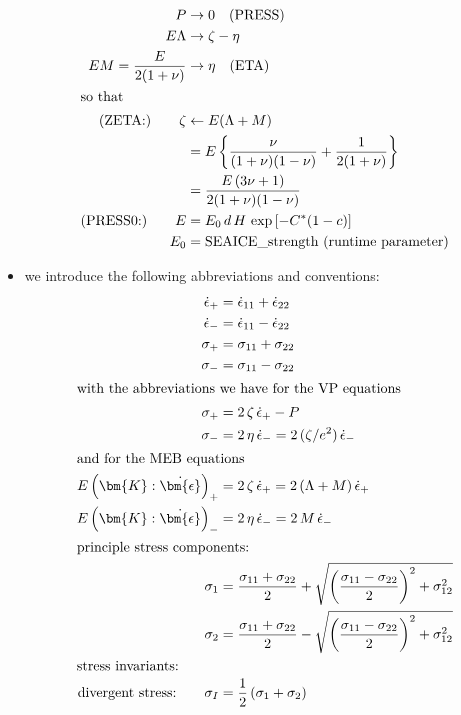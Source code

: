 \documentclass[12pt]{article}
\newcommand{\sr}{\dot{\epsilon}}
\newcommand{\srb}{\dot{\bm{\epsilon}}}
\begin{document}
\begin{itemize}
  \begin{align}
    \label{eq:p0}     P &\rightarrow0 \quad\text{(PRESS)}\\
    \label{eq:lambda} E\Lambda &\rightarrow \zeta - \eta \\
    \label{eq:mu}     EM
    = \frac{E}{2(1+\nu)} &\rightarrow \eta \quad\text{(ETA)} \\
    \intertext{so that}
    \label{eq:zeta} \text{(ZETA:)}\qquad
    \zeta &\leftarrow E(\Lambda+M) \\
                &= E\left\{\frac{\nu}{(1+\nu)(1-\nu)} +
                  \frac{1}{2(1+\nu)}\right\} \nonumber \\
                &= \frac{E\,(3\nu+1)}{2(1+\nu)(1-\nu)} \nonumber \\
    \text{(PRESS0:)}\qquad E &= E_0\,d\,H\,\exp\left[-C^*(1-c)\right] \\
    E_0&=\text{SEAICE\_strength (runtime parameter)}
  \end{align}
\item we introduce the following abbreviations and conventions:
  \begin{align}
    \sr_{+}&=\sr_{11}+\sr_{22}\\
    \sr_{-}&=\sr_{11}-\sr_{22}\\
    \sigma_{+}&=\sigma_{11}+\sigma_{22}\\
    \sigma_{-}&=\sigma_{11}-\sigma_{22} \\
    \intertext{with the abbreviations we have for the VP equations}
    \sigma_{+} &= 2\,\zeta\,\sr_{+} - P \\
    \sigma_{-} &= 2 \,\eta\,\sr_{-} = 2\,(\zeta/e^2)\,\sr_{-}\\
    \intertext{and for the MEB equations}
    \label{eq:mebplus} E\left(\bm{K}:\srb\right)_{+} &= 2\,\zeta\,\sr_{+}
    = 2\,(\Lambda+M)\,\sr_{+}\\
    \label{eq:mebminus}E\left(\bm{K}:\srb\right)_{-} &= 2\, \eta\,\sr_{-}
    = 2\,M\,\sr_{-}\\
    \intertext{principle stress components:}
    \sigma_1 &=\frac{\sigma_{11}+\sigma_{22}}{2}
               +\sqrt{\left(\frac{\sigma_{11}
               - \sigma_{22}}{2}\right)^2+\sigma_{12}^2}\\
    \sigma_2 &=\frac{\sigma_{11}+\sigma_{22}}{2}
               - \sqrt{\left(\frac{\sigma_{11} -
               \sigma_{22}}{2}\right)^2+\sigma_{12}^2}\\
    \intertext{stress invariants:}
    \text{divergent stress:}\qquad\sigma_{I}
           &= \frac{1}{2}\left(\sigma_1+\sigma_2\right)

\end{align}
\end{itemize}
\end{document}
